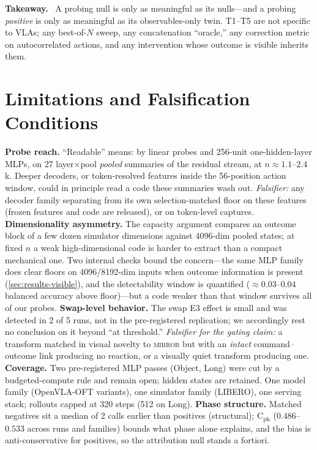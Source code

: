 \documentclass{article}
\newenvironment{takeaway}%
{\begin{lrbox}{\takeawaybox}\begin{minipage}{\dimexpr\columnwidth-14pt}%
\small\textbf{Takeaway.}\ }%
{\end{minipage}\end{lrbox}\par\vspace{4pt}\noindent%
{\setlength{\fboxsep}{6pt}\colorbox{shadecolor}{\usebox{\takeawaybox}}}\par\vspace{4pt}}
\begin{document}
\begin{takeaway}
A probing null is only as meaningful as its nulls---and a probing
\emph{positive} is only as meaningful as its observables-only twin. T1--T5
are not specific to VLAs; any best-of-$N$ sweep, any concatenation
``oracle,'' any correction metric on autocorrelated actions, and any
intervention whose outcome is visible inherits them.
\end{takeaway}

\section{Limitations and Falsification Conditions}
\label{sec:limits}

\textbf{Probe reach.} ``Readable'' means: by linear probes and 256-unit
one-hidden-layer MLPs, on 27 layer$\times$pool \emph{pooled} summaries of
the residual stream, at $n{\approx}1.1$--$2.4$k. Deeper decoders, or
token-resolved features inside the 56-position action window, could in
principle read a code these summaries wash out. \emph{Falsifier:} any
decoder family separating from its own selection-matched floor on these
features (frozen features and code are released), or on token-level
captures.
\textbf{Dimensionality asymmetry.} The capacity argument compares an
outcome block of a few dozen simulator dimensions against 4096-dim pooled
states; at fixed $n$ a weak high-dimensional code is harder to extract than
a compact mechanical one. Two internal checks bound the concern---the same
MLP family does clear floors on 4096/8192-dim inputs when outcome
information is present (\cref{sec:results-visible}), and the detectability
window is quantified ($\approx0.03$--$0.04$ balanced accuracy above
floor)---but a code weaker than that window survives all of our probes.
\textbf{Swap-level behavior.} The swap E3 effect is small and was detected
in 2 of 5 runs, not in the pre-registered replication; we accordingly rest
no conclusion on it beyond ``at threshold.'' \emph{Falsifier for the
gating claim:} a transform matched in visual novelty to \textsc{mirror} but
with an \emph{intact} command--outcome link producing no reaction, or a
visually quiet transform producing one.
\textbf{Coverage.} Two pre-registered MLP passes (Object, Long) were cut by
a budgeted-compute rule and remain open; hidden states are retained. One
model family (OpenVLA-OFT variants), one simulator family (LIBERO), one
serving stack; rollouts capped at 320 steps (512 on Long).
\textbf{Phase structure.} Matched negatives sit a median of 2 calls earlier
than positives (structural); C$_{\text{ph}}$ ($0.486$--$0.533$ across runs
and families) bounds what phase alone explains, and the bias is
anti-conservative for positives, so the attribution null stands a fortiori.
\end{document}
